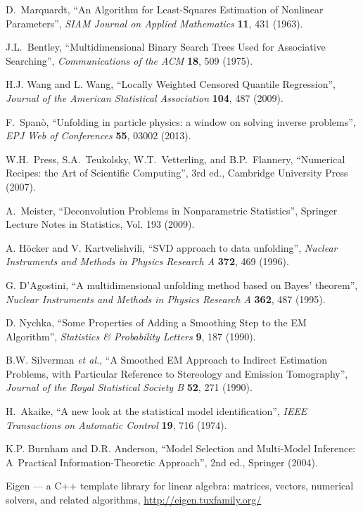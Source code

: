 \documentclass[12pt,titlepage]{article}
\newcommand{\etal}{\emph{et al.}}
\begin{document}
\begin{thebibliography}{99}
D.~Marquardt, ``An Algorithm for Least-Squares Estimation of Nonlinear Parameters'', {\it SIAM Journal on Applied Mathematics} {\bf 11}, 431 (1963).

 J.L.~Bentley, ``Multidimensional
Binary Search Trees Used for Associative Searching'',
{\it Communications of the ACM} {\bf 18}, 509 (1975).

 H.J. Wang and L. Wang, 
``Locally Weighted Censored Quantile Regression'',
{\it Journal of the American Statistical Association} {\bf 104}, 487 (2009).

F.~Span\`o, ``Unfolding in particle physics:
a window on solving inverse problems'',
{\it EPJ Web of Conferences} {\bf 55}, 03002 (2013).

W.H.~Press, S.A.~Teukolsky, W.T.~Vetterling, and B.P.~Flannery,
``Numerical Recipes: the Art of Scientific Computing'', 3rd ed.,
Cambridge University Press (2007).

A.~Meister, ``Deconvolution Problems in Nonparametric Statistics'',
Springer Lecture Notes in Statistics, Vol. 193 (2009).

A. H\"ocker and V. Kartvelishvili, ``SVD approach to data unfolding'',
{\it Nuclear Instruments and Methods in Physics Research A}
{\bf 372}, 469 (1996).

G. D'Agostini, ``A multidimensional unfolding method based on Bayes' theorem'', 
{\it Nuclear Instruments and Methods in Physics Research A}
{\bf 362}, 487 (1995).

D. Nychka, ``Some Properties of Adding a Smoothing Step to the EM Algorithm'',
{\it Statistics \& Probability Letters} {\bf 9}, 187 (1990).

B.W. Silverman \etal, ``A Smoothed EM Approach to Indirect Estimation Problems,
with Particular Reference to Stereology and Emission Tomography'',
{\it Journal of the Royal Statistical Society B} {\bf 52}, 271 (1990).

H.~Akaike, ``A new look at the statistical model identification'',
{\it IEEE Transactions on Automatic Control} {\bf 19}, 716 (1974).

K.P. Burnham and D.R. Anderson, ``Model Selection and Multi-Model Inference:
A~Practical Information-Theoretic Approach'', 2nd ed., Springer (2004).

Eigen --- a C++ template library for linear algebra:
matrices, vectors, numerical solvers, and related algorithms,
\href{http://eigen.tuxfamily.org/}{http://eigen.tuxfamily.org/}


\end{thebibliography}
\end{document}

